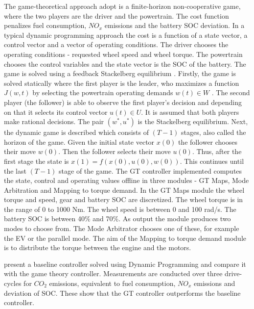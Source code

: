 The game-theoretical approach \citet{dextreit2014game} adopt is a finite-horizon non-cooperative game, where the two players are the driver and the powertrain. The cost function penalizes fuel consumption, $NO_x$ emissions and the battery SOC deviation. In a typical dynamic programming approach the cost is a function of a state vector, a control vector and a vector of operating conditions. The driver chooses the operating conditions - requested wheel speed and wheel torque. The powertrain chooses the control variables and the state vector is the SOC of the battery. The game is solved using a feedback Stackelberg equilibrium \citep{von1952theory}. Firstly, the game is solved statically where the first player is the leader, who maximizes a function $J(w,t)$ by selecting the powertrain operating demands $w(t) \in W$ . The second player (the follower) is able to observe the first player's decision and depending on that it selects its control vector $u(t) \in U$. It is assumed that both players make rational decisions. The pair $(w^*, u^*)$ is the Stackelberg equilibrium.
Next, the dynamic game is described which consists of $(T-1)$ stages, also called the horizon of the game. Given the initial state vector $x(0)$ the follower chooses their move $w(0)$. Then the follower selects their move $u(0)$. Thus, after the first stage the state is $x(1) = f(x(0),u(0),w(0))$. This continues until the last $(T-1)$ stage of the game.
The GT controller \citet{dextreit2014game} implemented computes the state, control and operating values offline in three modules - GT Maps, Mode Arbitration and Mapping to torque demand. In the GT Maps module the wheel torque and speed, gear and battery SOC are discretized. The wheel torque is in the range of 0 to 1000 Nm. The wheel speed is between 0 and 100 rad/s. The battery SOC is between 40\% and 70\%. As output the module produces two modes to choose from. The Mode Arbitrator chooses one of these, for example the EV or the parallel mode. The aim of the Mapping to torque demand module is to distribute the torque between the engine and the motors.

\citet{dextreit2014game} present a baseline controller solved using Dynamic Programming and compare it with the game theory controller. Measurements are conducted over three drive-cycles for $CO_2$ emissions, equivalent to fuel consumption, $NO_x$ emissions and deviation of SOC. These show that the GT controller outperforms the baseline controller.

